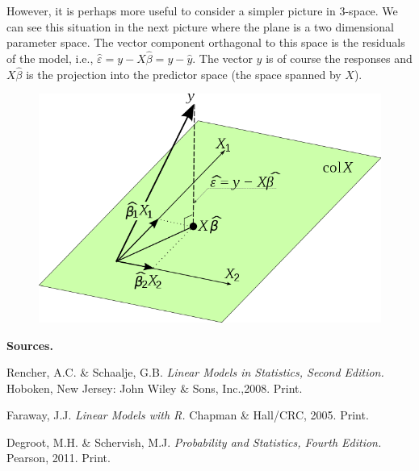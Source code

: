 \documentclass[a4paper]{article}
\numberwithin{equation}{section}
\begin{document}
\begin{description}
However, it is perhaps more useful to consider a simpler picture in 3-space. We can see this situation in the next picture where the plane is a two dimensional parameter space. The vector component orthagonal to this space is the residuals of the model, i.e., $\hat{\varepsilon} = y- X\hat{\beta} = y - \hat{y}$. The vector $y$ is of course the responses and $X\hat{\beta}$ is the projection into the predictor space (the space spanned by $X$).

\begin{figure}[t]
	\centering
	
    \includegraphics[scale=.3]{3SpaceProj.png}
\end{figure}

\item{\textbf{Sources.}}

Rencher, A.C. \& Schaalje, G.B. \textit{Linear Models in Statistics, Second Edition.} Hoboken, New Jersey: John Wiley \& Sons, Inc.,2008. Print.

Faraway, J.J. \textit{Linear Models with R.} Chapman \& Hall/CRC, 2005. Print.

Degroot, M.H. \& Schervish, M.J. \textit{Probability and Statistics, Fourth Edition.} Pearson, 2011. Print.

\end{description}
\end{document}
